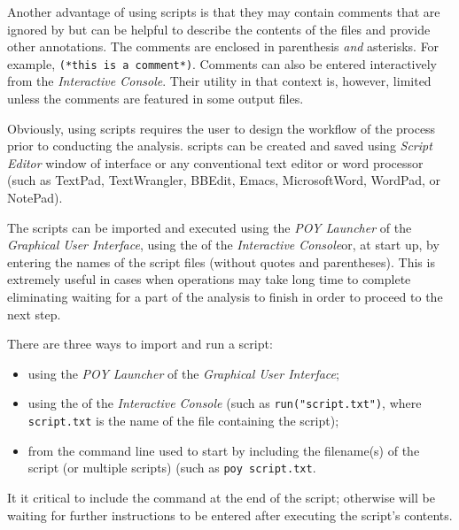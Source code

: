 Another advantage of using scripts is that they may contain comments that are ignored by \poy but can be helpful to describe the contents of the files and provide other annotations. The comments are enclosed in parenthesis \emph{and} asterisks. For example, \texttt{(*this is a comment*)}. Comments can also be entered interactively from the \emph{Interactive Console}. Their utility in that context is, however, limited unless the comments are featured in some output files.

Obviously, using scripts requires the user to design the workflow of the process prior to conducting the analysis. \poy scripts can be created and saved using \emph{Script Editor} window of \poy interface or any conventional text editor or word processor (such as TextPad, TextWrangler, BBEdit, Emacs, MicrosoftWord, WordPad, or NotePad).

The scripts can be imported and executed using the \emph{POY Launcher} of the \emph{Graphical User Interface}, using the  of the \emph{Interactive Console}or, at start up, by entering the names of the script files (without quotes and parentheses). This is extremely useful in cases when operations may take long time to complete eliminating waiting for a part of the analysis to finish in order to proceed to the next step.

There are three ways to import and run a script:
\begin{itemize}
    \item using the \emph{POY Launcher} of the \emph{Graphical User Interface};
    \item using the  of the \emph{Interactive Console} (such as \texttt{run("script.txt")}, where \texttt{script.txt} is the name of the file containing the script);
   \item from the command line used to start \poy by including the filename(s) of the script (or multiple scripts) (such as \texttt{poy script.txt}.
\end{itemize}

It it critical to include the command  at the end of the script; otherwise \poy will be waiting for further instructions to be entered after executing the script's contents.

